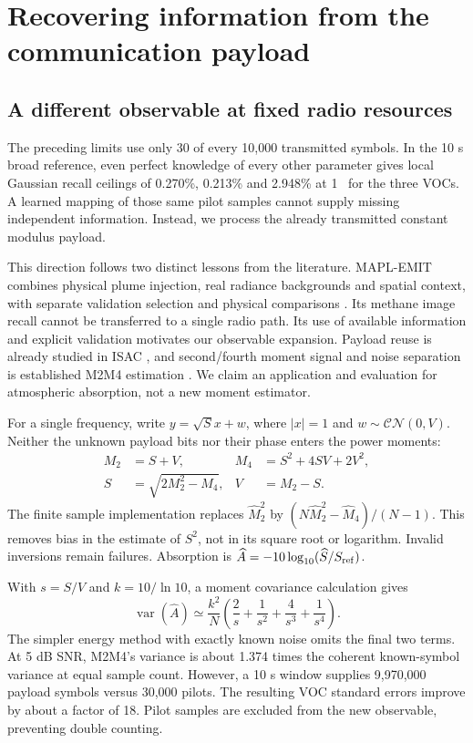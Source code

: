 \section{Recovering information from the communication payload}
\subsection{A different observable at fixed radio resources}
The preceding limits use only 30 of every 10,000 transmitted symbols. In the 10 s broad reference, even perfect knowledge of every other parameter gives local Gaussian recall ceilings of 0.270\%, 0.213\% and 2.948\% at 1 \ugm\ for the three VOCs. A learned mapping of those same pilot samples cannot supply missing independent information. Instead, we process the already transmitted constant modulus payload.

This direction follows two distinct lessons from the literature. MAPL-EMIT combines physical plume injection, real radiance backgrounds and spatial context, with separate validation selection and physical comparisons \cite{batchu}. Its methane image recall cannot be transferred to a single radio path. Its use of available information and explicit validation motivates our observable expansion. Payload reuse is already studied in ISAC \cite{payloadisac}, and second/fourth moment signal and noise separation is established M2M4 estimation \cite{m2m4}. We claim an application and evaluation for atmospheric absorption, not a new moment estimator.

For a single frequency, write $y=\sqrt S x+w$, where $|x|=1$ and $w\sim\mathcal{CN}(0,V)$. Neither the unknown payload bits nor their phase enters the power moments:
\begin{align}
M_2&=S+V,&M_4&=S^2+4SV+2V^2,\\
S&=\sqrt{2M_2^2-M_4},&V&=M_2-S.
\end{align}
The finite sample implementation replaces $\widehat M_2^2$ by $(N\widehat M_2^2-\widehat M_4)/(N-1)$. This removes bias in the estimate of $S^2$, not in its square root or logarithm. Invalid inversions remain failures. Absorption is $\widehat A=-10\log_{10}(\widehat S/S_{\rm ref})$.

With $s=S/V$ and $k=10/\ln10$, a moment covariance calculation gives
\begin{equation}
\operatorname{var}(\widehat A)\simeq\frac{k^2}{N}
\left(\frac2s+\frac1{s^2}+\frac4{s^3}+\frac1{s^4}\right).
\end{equation}
The simpler energy method with exactly known noise omits the final two terms. At 5 dB SNR, M2M4's variance is about 1.374 times the coherent known-symbol variance at equal sample count. However, a 10 s window supplies 9,970,000 payload symbols versus 30,000 pilots. The resulting VOC standard errors improve by about a factor of 18. Pilot samples are excluded from the new observable, preventing double counting.

